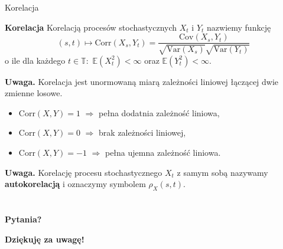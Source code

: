 \documentclass[a4paper, 11pt]{beamer}
\begin{document}
	\begin{frame}{Korelacja}
		\begin{block}{\textbf{Korelacja}}
			Korelacją procesów stochastycznych $X_t$ i $Y_t$ nazwiemy funkcję \[
				\left(s,t\right) \mapsto \mbox{Corr}\left(X_s, Y_t\right)
					= \frac{\mbox{Cov}\left(X_s, Y_t\right)}{\sqrt{\mbox{Var}\left(X_s\right)}\sqrt{\mbox{Var}\left(Y_t\right)}}
			\]
			o ile dla każdego $t\in\mathbb{T}:$ $\mathbb{E}\left(X_t^2\right) < \infty$ oraz $\mathbb{E}\left(Y_t^2\right) < \infty.$
		\end{block}
		
		\begin{alert}{\textbf{Uwaga.}}
			Korelacja jest unormowaną miarą zależności liniowej łączącej dwie zmienne losowe.
			\begin{itemize}
				\item $\mbox{Corr}\left(X, Y\right) = 1$ $\Rightarrow$ pełna dodatnia zależność liniowa,
				\item $\mbox{Corr}\left(X, Y\right) = 0$ $\Rightarrow$ brak zależności liniowej,
				\item $\mbox{Corr}\left(X, Y\right) = -1$ $\Rightarrow$ pełna ujemna zależność liniowa.
			\end{itemize}
		\end{alert}
		
		\begin{alert}{\textbf{Uwaga.}}
			Korelację procesu stochastycznego $X_t$ z samym sobą nazywamy \textbf{autokorelacją} i oznaczymy symbolem $\rho_X\left(s,t\right).$
		\end{alert}
	\end{frame}

	\section*{}

	\begin{frame}
		\center
		\Huge \bfseries
		Pytania?
	\end{frame}

	\begin{frame}
		\center
		\Huge \bfseries
		Dziękuję za uwagę!
	\end{frame}
\end{document}
